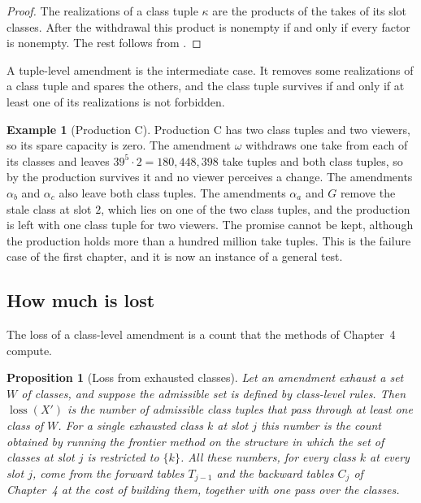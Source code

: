 \documentclass[11pt,twoside,openright]{book}
\theoremstyle{plain}
\newtheorem{proposition}[theorem]{Proposition}
\theoremstyle{definition}
\newtheorem{example}[theorem]{Example}
\theoremstyle{remark}
\DeclareMathOperator{\loss}{loss}
\begin{document}
\begin{proof}
The realizations of a class tuple $\kappa$ are the products of the takes of its slot classes. After the withdrawal this product is nonempty if and only if every factor is nonempty. The rest follows from .
\end{proof}

A tuple-level amendment is the intermediate case. It removes some realizations of a class tuple and spares the others, and the class tuple survives if and only if at least one of its realizations is not forbidden.

\begin{example}[Production C]\label{ex:C}
Production C has two class tuples and two viewers, so its spare capacity is zero. The amendment $\omega$ withdraws one take from each of its classes and leaves $39^5\cdot2=180{,}448{,}398$ take tuples and both class tuples, so by  the production survives it and no viewer perceives a change. The amendments $\alpha_b$ and $\alpha_c$ also leave both class tuples. The amendments $\alpha_a$ and $G$ remove the stale class at slot $2$, which lies on one of the two class tuples, and the production is left with one class tuple for two viewers. The promise cannot be kept, although the production holds more than a hundred million take tuples. This is the failure case of the first chapter, and it is now an instance of a general test.
\end{example}

\subsection{How much is lost}

The loss of a class-level amendment is a count that the methods of Chapter~4 compute.

\begin{proposition}[Loss from exhausted classes]\label{prop:loss}
Let an amendment exhaust a set $W$ of classes, and suppose the admissible set is defined by class-level rules. Then $\loss(X')$ is the number of admissible class tuples that pass through at least one class of $W$. For a single exhausted class $k$ at slot $j$ this number is the count obtained by running the frontier method on the structure in which the set of classes at slot $j$ is restricted to $\{k\}$. All these numbers, for every class $k$ at every slot $j$, come from the forward tables $T_{j-1}$ and the backward tables $C_j$ of Chapter~4 at the cost of building them, together with one pass over the classes.
\end{proposition}
\end{document}
